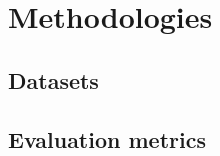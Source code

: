 
\chapter{Methodologies}


\label{Section5}



\section{Datasets}\label{Section5.1}


\section{Evaluation metrics}\label{Section5.2}


